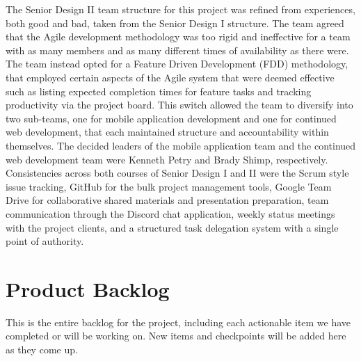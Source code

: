 The Senior Design II team structure for this project was refined from experiences, both good and bad, taken from the Senior Design I structure.  The team agreed that the Agile development methodology was too rigid and ineffective for a team with as many members and as many different times of availability as there were.  The team instead opted for a Feature Driven Development (FDD) methodology, that employed certain aspects of the Agile system that were deemed effective such as listing expected completion times for feature tasks and tracking productivity via the  project board. This switch allowed the team to diversify into two sub-teams, one for mobile application development and one for continued web development, that each maintained structure and accountability within themselves.  The decided leaders of the mobile application team and the continued web development team were Kenneth Petry and Brady Shimp, respectively.\\

Consistencies across both courses of Senior Design I and II were the Scrum style issue tracking, GitHub for the bulk project management tools, Google Team Drive for collaborative shared materials and presentation preparation, team communication through the Discord chat application, weekly status meetings with the project clients, and a structured task delegation system with a single point of authority.





\section{Product Backlog}


This is the entire backlog for the project, including each actionable item we 
have completed or will be working on. New items and checkpoints will be added 
here as they come up.

